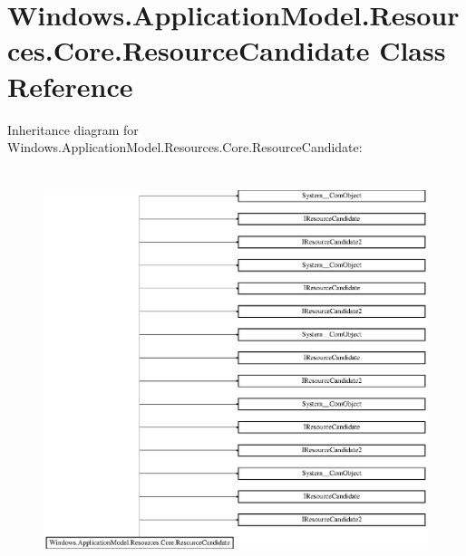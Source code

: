 \hypertarget{class_windows_1_1_application_model_1_1_resources_1_1_core_1_1_resource_candidate}{}\section{Windows.\+Application\+Model.\+Resources.\+Core.\+Resource\+Candidate Class Reference}
\label{class_windows_1_1_application_model_1_1_resources_1_1_core_1_1_resource_candidate}
Inheritance diagram for Windows.\+Application\+Model.\+Resources.\+Core.\+Resource\+Candidate\+:\begin{figure}[H]
\begin{center}
\leavevmode
\includegraphics[height=11.697128cm]{class_windows_1_1_application_model_1_1_resources_1_1_core_1_1_resource_candidate}
\end{center}
\end{figure}
